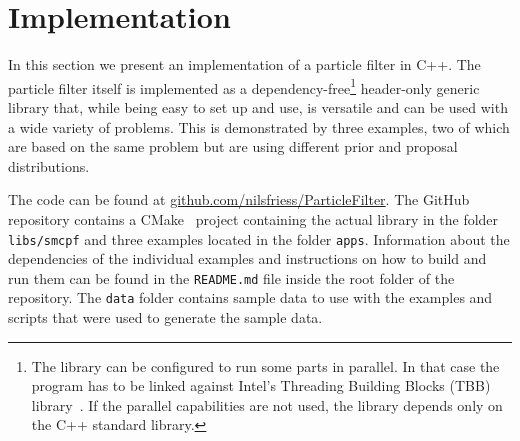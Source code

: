 \section*{Implementation}
In this section we present an implementation of a particle filter in
C++. The particle filter itself is implemented as a
dependency-free\footnote{The library can be configured to run some
  parts in parallel. In that case the program has to be linked against
  Intel's Threading Building Blocks (TBB) library~\cite{intel}. If the
  parallel capabilities are not used, the library depends only on the
  C++ standard library.} header-only generic library that, while being
easy to set up and use, is versatile and can be used with a wide
variety of problems. This is demonstrated by three examples, two of
which are based on the same problem but are using different prior and
proposal distributions.

The code can be found at
\url{github.com/nilsfriess/ParticleFilter}. The GitHub repository
contains a CMake~\cite{cmake} project containing the actual library in
the folder \texttt{libs/smcpf} and three examples located in the
folder \texttt{apps}. Information about the dependencies of the
individual examples and instructions on how to build and run them can
be found in the \texttt{README.md} file inside the root folder of the
repository. The \texttt{data} folder contains sample data to use with
the examples and scripts that were used to generate the sample data.

